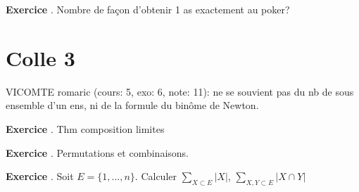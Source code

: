 \documentclass[10pt,a4paper]{article}
\newcounter{question}
\newcounter{exo}
\newenvironment{exo}{\vspace{0.5cm}\setcounter{question}{0}\addtocounter{exo}{1} \noindent \textbf{Exercice \theexo}. \normalsize }{\par}
\begin{document}
	\begin{exo}
		Nombre de façon d'obtenir 1 as exactement au poker?
	\end{exo}	

	\section*{Colle 3}
	\setcounter{exo}{0}
	VICOMTE romaric (cours: 5, exo: 6, note: 11): ne se souvient pas du nb de sous ensemble d'un ens, ni de la formule du binôme de Newton.\\
	
	\begin{exo}
		Thm composition limites
	\end{exo}
	
	\begin{exo}
		Permutations et combinaisons.
	\end{exo}	

	\begin{exo}
		Soit $E = \lbrace 1, ..., n \rbrace$. Calculer $\sum_{X \subset E} \vert X \vert$, $\sum_{X, Y \subset E} \vert X \cap Y \vert$
	\end{exo}		
	
\end{document}

